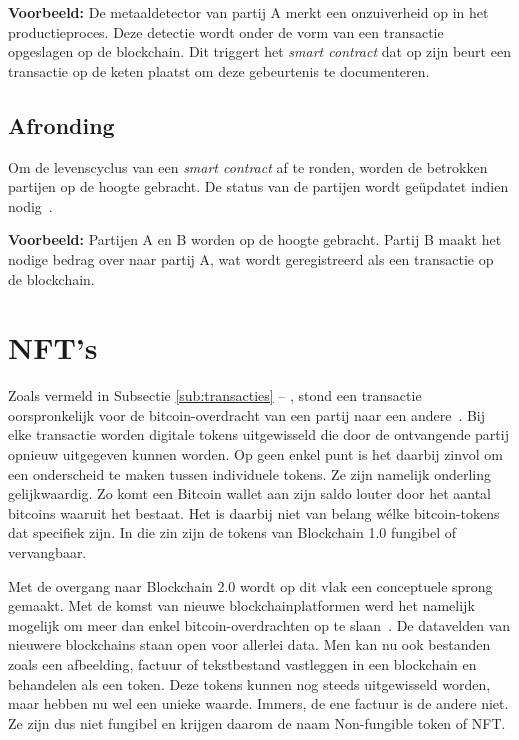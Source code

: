 \textbf{Voorbeeld:}
De metaaldetector van partij A merkt een onzuiverheid op in het productieproces. Deze detectie wordt onder de vorm van een transactie opgeslagen op de blockchain. Dit triggert het \textit{smart contract} dat op zijn beurt een transactie op de keten plaatst om deze gebeurtenis te documenteren.

\subsection{Afronding}
\label{sub:afronding}

Om de levenscyclus van een \textit{smart contract} af te ronden, worden de betrokken partijen op de hoogte gebracht. De status van de partijen wordt geüpdatet indien nodig~\autocite{Zheng2019}.

\textbf{Voorbeeld:}
Partijen A en B worden op de hoogte gebracht. Partij B maakt het nodige bedrag over naar partij A, wat wordt geregistreerd als een transactie op de blockchain.



\section{NFT's}
\label{sec:nfts}

Zoals vermeld in Subsectie \ref{sub:transacties} -- , stond een transactie oorspronkelijk voor de bitcoin-overdracht van een partij naar een andere~\autocite{Pierro2017}. Bij elke transactie worden digitale tokens uitgewisseld die door de ontvangende partij opnieuw uitgegeven kunnen worden. Op geen enkel punt is het daarbij zinvol om een onderscheid te maken tussen individuele tokens. Ze zijn namelijk onderling gelijkwaardig. Zo komt een Bitcoin wallet aan zijn saldo louter door het aantal bitcoins waaruit het bestaat. Het is daarbij niet van belang wélke bitcoin-tokens dat specifiek zijn. In die zin zijn de tokens van Blockchain 1.0 fungibel of vervangbaar.

Met de overgang naar Blockchain 2.0 wordt op dit vlak een conceptuele sprong gemaakt. Met de komst van nieuwe blockchainplatformen werd het namelijk mogelijk om meer dan enkel bitcoin-overdrachten op te slaan~\autocite{Swan2015}. De datavelden van nieuwere blockchains staan open voor allerlei data. Men kan nu ook bestanden zoals een afbeelding, factuur of tekstbestand vastleggen in een blockchain en behandelen als een token. Deze tokens kunnen nog steeds uitgewisseld worden, maar hebben nu wel een unieke waarde. Immers, de ene factuur is de andere niet. Ze zijn dus niet fungibel en krijgen daarom de naam Non-fungible token of NFT.

